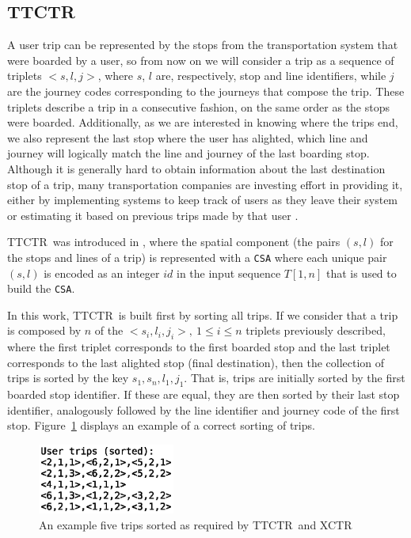 \documentclass[runningheads]{llncs}
\newcommand{\ctr}{XCTR}
\newcommand{\ttctr}{TTCTR}
\begin{document}
\subsection{\ttctr}
A user trip can be represented by the stops from the transportation system that were boarded by a user, so from now on we will consider a trip as a sequence of triplets $<s,l,j>$, where $s$, $l$ are, respectively, stop and line identifiers, while $j$ are the journey codes corresponding to the journeys that compose the trip. These triplets describe a trip in a consecutive fashion, on the same order as the stops were boarded. Additionally, as we are interested in knowing where the trips end, we also represent the last stop where the user has alighted, which line and journey will logically match the line and journey of the last boarding stop. Although it is generally hard to obtain information about the last destination stop of a trip, many transportation companies are investing effort in providing it, either by implementing systems to keep track of users as they leave their system or estimating it based on previous trips made by that user \cite{alsger2016validating}.

\ttctr~was introduced in \cite{brisaboa2018new}, where the spatial component (the pairs $(s,l)$ for the stops and lines of a trip) is represented with a \texttt{CSA} where each unique pair $(s,l)$ is encoded as an integer $id$ in the input sequence $T[1,n]$ that is used to build the \texttt{CSA}.

In this work, \ttctr~is built first by sorting all trips. If we consider that a trip is composed by $n$ of the $<s_i,l_i,j_i>,~1\leq i\leq n$ triplets previously described, where the first triplet corresponds to the first boarded stop and the last triplet corresponds to the last alighted stop (final destination), then the collection of trips is sorted by the key $s_1,s_n,l_1,j_1$. That is, trips are initially sorted by the first boarded stop identifier. If these are equal, they are then sorted by their last stop identifier, analogously followed by the line identifier and journey code of the first stop. Figure~\ref{fig:example_trips} displays an example of a correct sorting of trips.

\begin{figure}[hbt!]
\includegraphics[width=0.4\textwidth]{example_trips.eps}
\caption{An example five trips sorted as required by \ttctr~and \ctr}
\label{fig:example_trips}
\end{figure}
\end{document}
